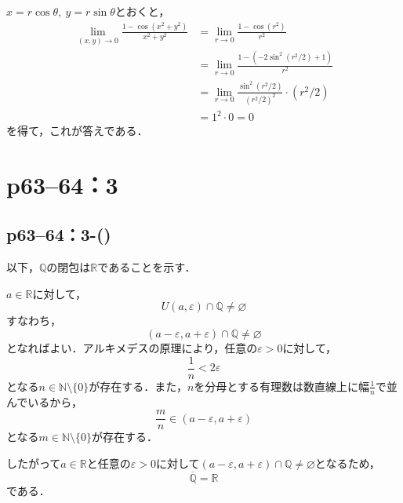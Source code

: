 \documentclass[a4paper,10pt,fleqn]{ltjsarticle}
\begin{document}
\begin{tleftbar}
    $x=r \cos \theta,~y=r\sin \theta$とおくと，
    \begin{align*}
        \lim_{(x,y)\to 0} \frac{1-\cos (x^2+y^2)}{x^2+y^2} & = \lim_{r \to 0} \frac{1-\cos (r^2)}{r^2}                       \\
                                                           & =\lim_{r \to 0} \frac{1-(-2\sin ^2 (r^2/2)+1)}{r^2}             \\
                                                           & =\lim_{r \to 0} \frac{\sin ^2 (r^2/2)}{(r^2/2)^2} \cdot (r^2/2) \\
                                                           & = 1^2 \cdot 0 =0
    \end{align*}
    を得て，これが答えである．
\end{tleftbar}


\section*{p63--64：3}


\subsection*{p63--64：3-()}

\begin{tleftbar}
    以下，$\mathbb{Q}$の閉包は$\mathbb{R}$であることを示す．

    $a \in \mathbb{R}$に対して，
    \[
        U(a,\varepsilon) \cap \mathbb{Q} \ne \varnothing
    \]
    すなわち，
    \[
        (a-\varepsilon,a+\varepsilon) \cap \mathbb{Q} \ne \varnothing
    \]
    となればよい．アルキメデスの原理により，任意の$\varepsilon >0$に対して，
    \[
        \frac{1}{n}< 2\varepsilon
    \]
    となる$n \in \mathbb{N} \setminus \{0\}$が存在する．また，$n$を分母とする有理数は数直線上に幅$\frac{1}{n}$で並んでいるから，
    \[
        \frac{m}{n} \in (a-\varepsilon,a+\varepsilon)
    \]
    となる$ m \in \mathbb{N} \setminus \{0\}$が存在する．\par
    したがって$a \in \mathbb{R}$と任意の$\varepsilon>0$に対して$(a-\varepsilon,a+\varepsilon) \cap \mathbb{Q} \ne \varnothing$となるため，
    \[
        \overline{\mathbb{Q}}=\mathbb{R}
    \]
    である．
\end{tleftbar}
\end{document}

